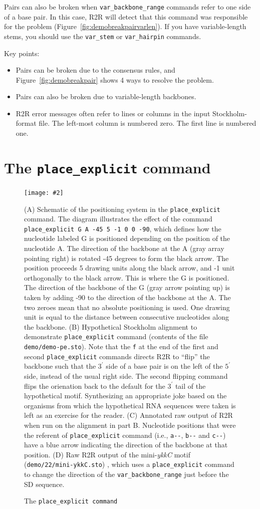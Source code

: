 \documentclass[letterpaper,12pt]{report}
\newcommand{\indexcmd}[1]{\index{R2R commands!\texttt{#1}}}
\newcommand{\fig}[4]{
\begin{figure}
\texttt{[image: \#2]}
\caption{#3}

\begin{small}
#4
\end{small}
\label{#1}
\end{figure}
}
\begin{document}
\indexcmd{var\_backbone\_range}
Pairs can also be broken when {\tt var\_backbone\_range} commands refer to one side of a base pair.  In this case, R2R will detect that this command was responsible for the problem (Figure~\ref{fig:demobreakpairvarlen}).  If you have variable-length stems, you should use the {\tt var\_stem} or {\tt var\_hairpin} commands.

Key points:
\begin{itemize}
\item Pairs can be broken due to the consensus rules, and Figure~\ref{fig:demobreakpair} shows 4 ways to resolve the problem.
\item Pairs can also be broken due to variable-length backbones.
\item R2R error messages often refer to lines or columns in the input Stockholm-format file.  The left-most column is numbered zero.  The first line is numbered one.
\end{itemize}

\section[The place\_explicit command]{The {\tt place\_explicit} command}
\fig{fig:placeexplicit}{figures/place_explicit.pdf}{The {\tt place\_explicit command}}{
(A)
Schematic of the positioning system in the {\tt place\_explicit} command.
The diagram illustrates the effect of the command {\tt place\_explicit G A -45 5 -1 0 0 -90},
which defines how the nucleotide labeled G is positioned depending on the position of the nucleotide A.
The direction of the backbone at the A (gray array pointing right) is rotated -45 degrees to form the black arrow.
The position proceeds 5 drawing units along the black arrow, and -1 unit orthogonally to the black arrow.
This is where the G is positioned.
The direction of the backbone of the G (gray arrow pointing up) is taken by adding -90 to the direction of the backbone at the A.
The two zeroes mean that no absolute positioning is used.
One drawing unit is equal to the distance between consecutive nucleotides along the backbone.
(B)
Hypothetical Stockholm alignment to demonstrate {\tt place\_explicit} command (contents of the file {\tt demo/demo-pe.sto}).
Note that the {\tt f} at the end of the first and second {\tt place\_explicit} commands directs R2R to ``flip'' the backbone such that the $3^\prime$ 
side of a base pair is on the left of the $5^\prime$ side, instead of the usual right side.
The second flipping command flips the orienation back to the default for the $3^\prime$ tail of the hypothetical motif.
Synthesizing an appropriate joke based on the organisms from which the hypothetical RNA sequences were taken is left as an exercise for the reader.
(C)
Annotated raw output of R2R when run on the alignment in part B.
Nucleotide positions that were the referent of {\tt place\_explicit}
command (i.e., {\tt a-{}-}, {\tt b-{}-} and {\tt c-{}-}) have a blue arrow indicating the direction of the backbone at that position.
(D)
Raw R2R output of the mini-{\it ykkC} motif ({\tt demo/22/mini-ykkC.sto}) \cite{Weinberg22Motifs}, which uses a {\tt place\_explicit} command
to change the direction of the {\tt var\_backbone\_range} just before the SD sequence.
}
\end{document}
